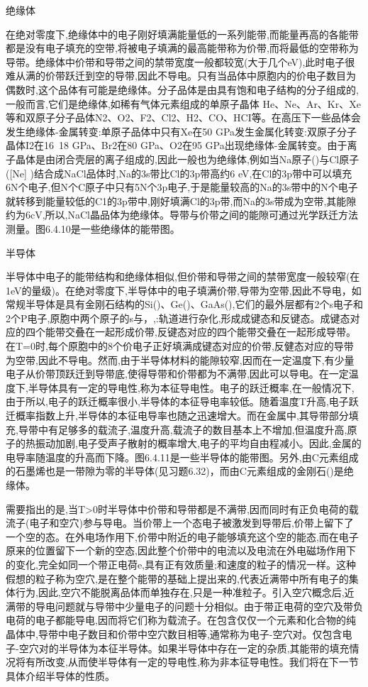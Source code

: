 绝缘体

在绝对零度下,绝缘体中的电子刚好填满能量低的一系列能带,而能量再高的各能带都是没有电子填充的空带,将被电子填满的最高能带称为价带,而将最低的空带称为导带。绝缘体中价带和导带之间的禁带宽度一般都较宽(大于几个eV),此时电子很难从满的价带跃迁到空的导带,因此不导电。只有当品体中原胞内的价电子数目为偶数时,这个品体有可能是绝缘体。分子品体是由具有饱和电子结构的分子组成的,一般而言,它们是绝缘体,如稀有气体元素组成的单原子晶体 He、Ne、Ar、Kr、Xe等和双原子分子品体N2、O2、F2、Cl2、H2、CO、HCI等。在高压下一些品体会发生绝缘体-金属转变:单原子品体中只有Xe在50 GPa发生金属化转变:双原子分子晶体I2在16~18 GPa、Br2在80 GPa、O2在95 GPa出现绝缘体-金属转变。由于离子晶体是由闭合壳层的离子组成的,因此一般也为绝缘体,例如当Na原子()与Cl原子([Ne] )结合成NaCl品体时,Na的3s带比Cl的3p带高约6 eV,在Cl的3p带中可以填充6N个电子,但N个C原子中只有5N个3p电子,于是能量较高的Na的3s带中的N个电子就转移到能量较低的C1的3p带中,刚好填满Cl的3p带,而Na的3s带成为空带,其能隙约为6cV,所以,NaCl晶品体为绝缘体。导带与价带之间的能隙可通过光学跃迁方法测量。图6.4.10是一些绝缘体的能带图。



半导体

半导体中电子的能带结构和绝缘体相似,但价带和导带之间的禁带宽度一般较窄(在1eV的量级)。在绝对零度下,半导体中的电子填满价带,导带为空带,因此不导电，如常规半导体是具有金刚石结构的Si()、Ge()、GaAs(),它们的最外层都有2个s电子和2个P电子,原胞中两个原子的s与，,:轨道进行杂化,形成成键态和反键态。成键态对应的四个能带交叠在一起形成价带,反键态对应的四个能带交叠在一起形成导带。在T=0时,每个原胞中的8个价电子正好填满成键态对应的价带,反健态对应的导带为空带,因此不导电。然而,由于半导体材料的能隙较窄,因而在一定温度下,有少量电子从价带顶跃迁到导带底,使得导带和价带都为不满带,因此可以导电。在一定温度下,半导体具有一定的导电性,称为本征导电性。电子的跃迁概率,在一般情况下,由于所以,电子的跃迁概率很小,半导体的本征导电率较低。随着温度T升高,电子跃迁概率指数上升,半导体的本征电导率也随之迅速增大。而在金属中,其导带部分填充,导带中有足够多的载流子,温度升高,载流子的数目基本上不增加,但温度升高,原子的热振动加剧,电子受声子散射的概率增大,电子的平均自由程减小。因此,金属的电导率随温度的升高而下降。图6.4.11是一些半导体的能带图。另外,由C元素组成的石墨烯也是一带隙为零的半导体(见习题6.32)，而由C元素组成的金刚石()是绝缘体。

需要指出的是,当T>0时半导体中价带和导带都是不满带,因而同时有正负电荷的载流子(电子和空穴)参与导电。当价带上一个态电子被激发到导带后,价带上留下了一个空的态。在外电场作用下,价带中附近的电子能够填充这个空的能态,而在电子原来的位置留下一个新的空态,因此整个价带中的电流以及电流在外电磁场作用下的变化,完全如同一个带正电荷e,具有正有效质量;和速度的粒子的情况一样。这种假想的粒子称为空穴,是在整个能带的基础上提出来的,代表近满带中所有电子的集体行为,因此,空穴不能脱离品体而单独存在,只是一种准粒子。引入空穴概念后,近满带的导电问题就与导带中少量电子的问题十分相似。由于带正电荷的空穴及带负电荷的电子都能导电,因而将它们称为载流子。在包含仅仅一个元素和化合物的纯晶体中,导带中电子数目和价带中空穴数目相等,通常称为电子-空穴对。仅包含电子-空穴对的半导体为本征半导体。如果半导体中存在一定的杂质,其能带的填充情况将有所改变,从而使半导体有一定的导电性,称为非本征导电性。我们将在下一节具体介绍半导体的性质。



